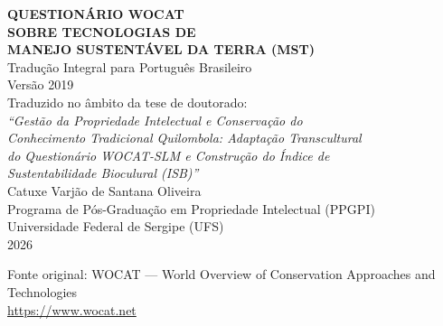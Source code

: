 \documentclass[12pt,a4paper,brazil]{article}
\begin{document}
\begin{titlepage}
\centering
\vspace*{3cm}

{\Large\bfseries QUESTIONÁRIO WOCAT}\\[0.5cm]
{\Large\bfseries SOBRE TECNOLOGIAS DE}\\[0.5cm]
{\Large\bfseries MANEJO SUSTENTÁVEL DA TERRA (MST)}\\[1.5cm]

{\large Tradução Integral para Português Brasileiro}\\[0.3cm]
{\large Versão 2019}\\[3cm]

{\normalsize Traduzido no âmbito da tese de doutorado:}\\[0.3cm]
{\normalsize\itshape ``Gestão da Propriedade Intelectual e Conservação do}\\
{\normalsize\itshape Conhecimento Tradicional Quilombola: Adaptação Transcultural}\\
{\normalsize\itshape do Questionário WOCAT-SLM e Construção do Índice de}\\
{\normalsize\itshape Sustentabilidade Bioculural (ISB)''}\\[2cm]

{\normalsize Catuxe Varjão de Santana Oliveira}\\[0.3cm]
{\normalsize Programa de Pós-Graduação em Propriedade Intelectual (PPGPI)}\\[0.3cm]
{\normalsize Universidade Federal de Sergipe (UFS)}\\[0.3cm]
{\normalsize 2026}

\vfill
{\footnotesize Fonte original: WOCAT --- World Overview of Conservation Approaches and Technologies\\
\url{https://www.wocat.net}}

\end{titlepage}

\tableofcontents
\newpage


\end{document}
